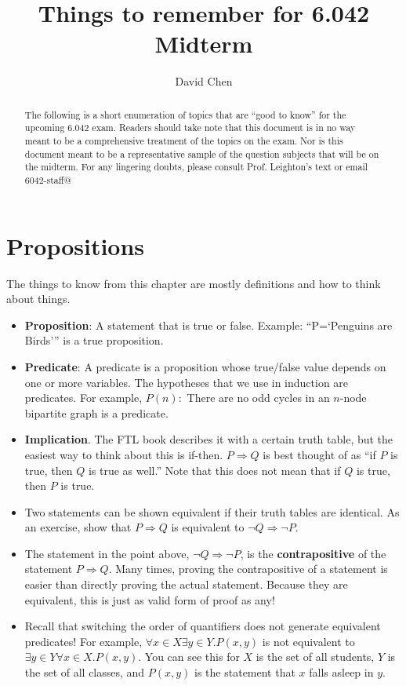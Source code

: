 \documentclass[11pt]{article}
\title{Things to remember for 6.042 Midterm}
\author{David Chen}
\begin{document}
\maketitle

\begin{abstract}
The following is a short enumeration of topics that are ``good to know'' for the upcoming 6.042 exam.  Readers should take note that this document is in no way meant to be a comprehensive
treatment of the topics on the exam.  Nor is this document meant to be a representative sample of the question subjects that will be on the midterm.  For any lingering doubts, please consult 
Prof. Leighton's text or email 6042-staff@
\end{abstract}


\section{Propositions}
The things to know from this chapter are mostly definitions and how to think about things.

\begin{itemize}
\item \textbf{Proposition}: A statement that is true or false.  Example: ``P=`Penguins are Birds''' is a true proposition.  
\item \textbf{Predicate}: A predicate is a proposition whose true/false value depends on one or more variables.  The hypotheses that we use in induction are predicates.  For example, $P(n):$ There are no odd cycles in an $n$-node bipartite graph is a predicate.
\item \textbf{Implication}.  The FTL book describes it with a certain truth table, but the easiest way to think about this is if-then.  $P \Rightarrow Q$ is best thought of as ``if $P$ is true, then $Q$ is true as well.''  Note that this does not mean that if $Q$ is true, then $P$ is true.

\item Two statements can be shown equivalent if their truth tables are identical.  As an exercise, show that $P \Rightarrow Q$ is equivalent to $\neg Q \Rightarrow \neg P$.
\item The statement in the point above, $\neg Q \Rightarrow \neg P$, is the \textbf{contrapositive} of the statement $P \Rightarrow Q$.  Many times, proving
the contrapositive of a statement is easier than directly proving the actual statement.  Because they are equivalent, this is just as valid form of proof as any!
\item Recall that switching the order of quantifiers does not generate equivalent predicates!  For example, $\forall x \in X \exists y \in Y. P(x, y)$ is not equivalent to 
$\exists y \in Y \forall x \in X. P(x, y)$.  You can see this for $X$ is the set of all students, $Y$ is the set of all classes, and $P(x, y)$ is the statement that $x$ falls asleep in $y$. 
\end{itemize}
\end{document}

